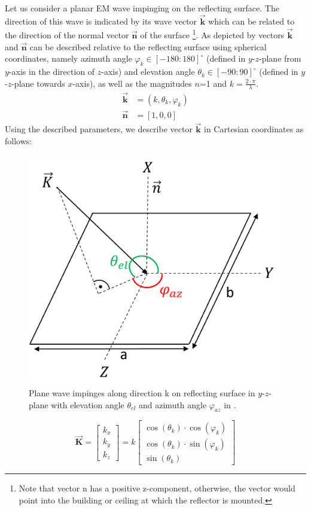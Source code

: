 Let us consider a planar EM wave impinging on the reflecting surface. The direction of this wave is indicated by its wave vector $\overrightarrow{\textbf{k}}$ which can be related to the direction of the normal vector $\overrightarrow{\textbf{n}}$ of the surface \footnote{Note that vector n has a positive z-component, otherwise, the vector would point into the building or ceiling at which the reflector is mounted.}. As depicted by   vectors $\overrightarrow{\textbf{k}}$ and $\overrightarrow{\textbf{n}}$ can be described relative to the reflecting surface using spherical coordinates, namely azimuth angle $\varphi_k \in [-180:180]^\circ$ (defined in $y$-$z$-plane from $y$-axis in the direction of $z$-axis) and elevation angle $\theta_k \in [-90:90]^\circ$ (defined in $y$-$z$-plane towards $x$-axis), as well as the magnitudes $n$=\num{1} and $k= \frac{2 \cdot \pi}{\lambda}$.
\begin{equation} \label{Vectork}
	\begin{split}
		\overrightarrow{\textbf{k}} &= (k, \theta_{k}, \varphi_{k})\\
		\overrightarrow{\textbf{n}} &= [1, 0, 0]
	\end{split}
\end{equation}
Using the described parameters, we describe vector $\overrightarrow{\textbf{k}}$ in Cartesian coordinates as follows:
\begin{figure}[tb]
	\centering
	\includegraphics[width=0.5\linewidth]{images/Section 2 Images/coordinate_system}
	\caption{Plane wave impinges along direction k on reflecting surface in $y$-$z$-plane with elevation angle $\theta_{el}$ and azimuth angle $\varphi_{az}$ in \si{\deg}.}
	\label{fig:3D model}
\end{figure}
\begin{equation} \label{Eq:Coordinates conversion of impinging wave vector_1}
	\overrightarrow{\textbf{K}} =
	\begin{bmatrix}
		k_x\\ k_y\\k_z
	\end{bmatrix}
	= k
	\begin{bmatrix}
		\cos(\theta_{k}) \cdot  \cos(\varphi_{k})  \\ 
		\cos(\theta_{k}) \cdot \sin(\varphi_{k})\\
		\sin(\theta_{k})
	\end{bmatrix}
\end{equation}
